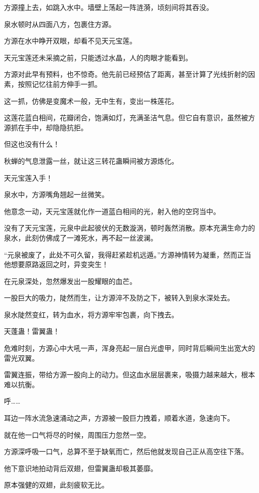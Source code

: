 \begin{this_body}
方源撞上去，如跳入水中。墙壁上荡起一阵涟漪，顷刻间将其吞没。

泉水顿时从四面八方，包裹住方源。

方源在水中睁开双眼，却看不见天元宝莲。

天元宝莲还未采摘之前，只能透过水晶，人的肉眼才能看到。

方源对此早有预料，也不惊奇。他先前已经预估了距离，甚至计算了光线折射的因素，按照记忆往前方伸手一抓。

这一抓，仿佛是变魔术一般，无中生有，变出一株莲花。

这莲花蓝白相间，花瓣闭合，饱满如灯，充满圣洁气息。但它自有意识，虽然被方源抓在手中，却隐隐抗拒。

但这也没有什么！

秋蝉的气息泄露一丝，就让这三转花蛊瞬间被方源炼化。

天元宝莲入手！

泉水中，方源嘴角翘起一丝微笑。

他意念一动，天元宝莲就化作一道蓝白相间的光，射入他的空窍当中。

没有了天元宝莲，元泉中此起彼伏的无数漩涡，顿时轰然消散。原本充满生命力的泉水，此刻仿佛成了一滩死水，再不起一丝波澜。

“元泉被废了，此处不可久留，我得赶紧趁机远遁。”方源神情转为凝重，然而正当他想要原路返回之时，异变突生！

在元泉深处，忽然爆发出一股耀眼的血芒。

一股巨大的吸力，陡然而生，让方源淬不及防之下，被转入到泉水深处去。

泉水陡然变红，转为血水，将方源牢牢包裹，向下拽去。

天蓬蛊！雷翼蛊！

危难时刻，方源心中大吼一声，浑身亮起一层白光虚甲，同时背后瞬间生出宽大的雷光双翼。

雷翼连振，带给方源一股向上的动力。但这血水层层裹来，吸摄力越来越大，根本难以抗衡。

呼……

耳边一阵水流急速涌动之声，方源被一股巨力拽着，顺着水道，急速向下。

就在他一口气将尽的时候，周围压力忽然一空。

方源深呼吸一口气，总算不至于缺氧而亡，然后他就发现自己正从高空往下落。

他下意识地拍动背后双翅，但雷翼蛊却极其萎靡。

原本强健的双翅，此刻疲软无比。


\end{this_body}
